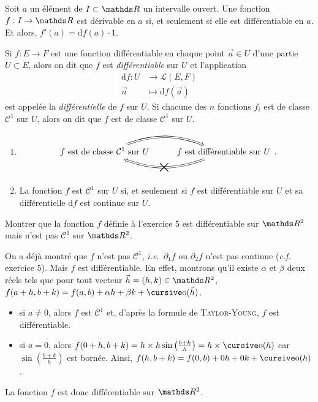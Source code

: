 \begin{rmk}
	Soit $a$ un élément de $I \subset \R$ un intervalle ouvert. Une fonction $f : I \to \R$ est dérivable en $a$ si, et seulement si elle est différentiable en $a$. Et alors, $f'(a) = \mathrm{d}f(a)\cdot 1$.
\end{rmk}

\begin{defn}
	Si $f : E \to F$ est une fonction différentiable en chaque point $\vec{a} \in U$ d'une partie $U \subset E$, alors on dit que $f$ est \textit{différentiable} sur $U$ et l'application
	\begin{align*}
		\mathrm{d}f: U &\longrightarrow \mathcal{L}(E, F) \\
		\vec{a} &\longmapsto \mathrm{d}f(\vec{a})
	\end{align*}
	est appelée la \textit{différentielle} de $f$ sur $U$.
	Si chacune des $n$ fonctions $f_i$ est de classe $\mathcal{C}^1$ sur $U$, alors on dit que $f$ est de classe $\mathcal{C}^1$ sur $U$.
\end{defn}

\begin{prop}
	\begin{enumerate}
		\item
			\[
				\begin{tikzcd}
					\text{$f$ est de classe $\mathcal{C}^1$ sur $U$} \arrow[r, Rightarrow, bend left=20]
					\arrow[r, Leftarrow, bend right=20, "\text{\huge$\times$}"{anchor=center, sloped}] & \text{$f$ est différentiable sur $U$}
				\end{tikzcd}
			.\]
		\item La fonction $f$ est $\mathcal{C}^1$ sur $U$ si, et seulement si $f$ est différentiable sur $U$ et sa différentielle $\mathrm{d}f$ est continue sur $U$.
	\end{enumerate}
\end{prop}

\begin{exo}
	\begin{slshape}
		Montrer que la fonction $f$ définie à l'exercice 5 est différentiable sur $\R^2$ mais n'est pas $\mathcal{C}^1$ sur $\R^2$.
	\end{slshape}

	On a déjà montré que $f$ n'est pas $\mathcal{C}^1$, \textit{i.e.}\ $\partial_1 f$ ou $\partial_2 f$ n'est pas continue (\textit{c.f.} exercice 5).
	Mais $f$ est différentiable. En effet, montrons qu'il existe $\alpha$ et $\beta$ deux réels tels que pour tout vecteur $\vec{h} = (h,k) \in \R^2$, $f(a+h, b+k) = f(a,b) + \alpha h + \beta k + \po(\vec{h})$.
	\begin{itemize}
		\item si $a \neq 0$, alors $f$ est $\mathcal{C}^1$ et, d'après la formule de \textsc{Taylor-Young}, $f$ est différentiable.
		\item si $a = 0$, alors $f(0+h, b+k) = h \times h \sin\left( \frac{b+k}{h} \right) = h \times \po(h)$ car $\sin\left( \frac{b+k}{h} \right)$ est bornée.
			Ainsi, $f(h,b+k) = f(0,b) + 0h + 0k + \po(h)$.
	\end{itemize}
	La fonction $f$ est donc différentiable sur $\R^2$.
\end{exo}

